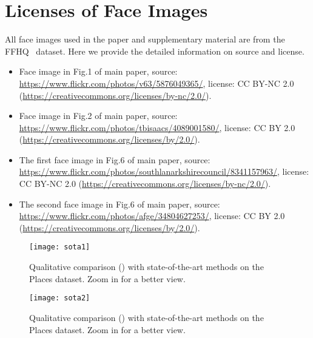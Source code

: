 \documentclass[10pt,twocolumn,letterpaper]{article}
\begin{document}
	\section{Licenses of Face Images}
	\label{sec:license}
	All face images used in the paper and supplementary material are from the FFHQ~\cite{karras2019style} dataset. Here we provide the detailed information on source and license.
	\begin{itemize}
		\item Face image in Fig.1 of main paper, source: \url{https://www.flickr.com/photos/v63/5876049365/}, license: CC BY-NC 2.0 (\url{https://creativecommons.org/licenses/by-nc/2.0/}).
		
		\item Face image in Fig.2 of main paper, source: \url{https://www.flickr.com/photos/tbisaacs/4089001580/}, license: CC BY 2.0 (\url{https://creativecommons.org/licenses/by/2.0/}).
		
		\item The first face image in Fig.6 of main paper, source: \url{https://www.flickr.com/photos/southlanarkshirecouncil/8341157963/},  license: CC BY-NC 2.0 (\url{https://creativecommons.org/licenses/by-nc/2.0/}).
		
		\item The second face image in Fig.6 of main paper, source: \url{https://www.flickr.com/photos/afge/34804627253/}, license: CC BY 2.0 (\url{https://creativecommons.org/licenses/by/2.0/}).
	\end{itemize}
	
	
	\begin{figure*}[t]
		\begin{center}
			\texttt{[image: sota1]}
		\end{center}
		\caption{Qualitative comparison () with state-of-the-art methods on the Places dataset. Zoom in for a better view.}
		\label{fig:sota1}
	\end{figure*}
	
	\begin{figure*}[t]
		\begin{center}
			\texttt{[image: sota2]}
		\end{center}
		\caption{Qualitative comparison () with state-of-the-art methods on the Places dataset. Zoom in for a better view.}
		\label{fig:sota2}
	\end{figure*}
	
\end{document}
